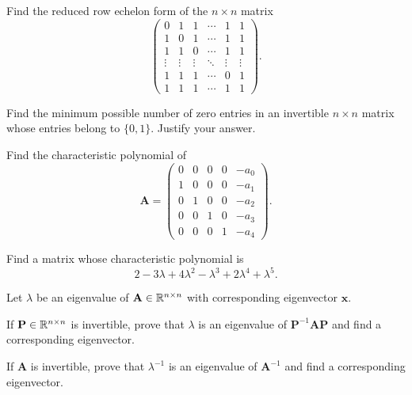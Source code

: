 \begin{problem}
\begin{problemsubparts}
\item Find the reduced row echelon form of the $n\times n$ matrix
\[
\begin{pmatrix}
0&1&1&\cdots&1&1\\
1&0&1&\cdots&1&1\\
1&1&0&\cdots&1&1\\
\vdots&\vdots&\vdots&\ddots&\vdots&\vdots\\
1&1&1&\cdots&0&1\\
1&1&1&\cdots&1&1
\end{pmatrix}.
\]
\item Find the minimum possible number of zero entries in an invertible $n\times n$ matrix whose entries belong to $\{0,1\}$. Justify your answer.
\end{problemsubparts}
\end{problem}

\begin{problem}
\begin{problemsubparts}
\item Find the characteristic polynomial of
\[
\mathbf A=
\begin{pmatrix}
0&0&0&0&-a_0\\
1&0&0&0&-a_1\\
0&1&0&0&-a_2\\
0&0&1&0&-a_3\\
0&0&0&1&-a_4
\end{pmatrix}.
\]
\item Find a matrix whose characteristic polynomial is
\[
2-3\lambda+4\lambda^2-\lambda^3+2\lambda^4+\lambda^5.
\]
\end{problemsubparts}
\end{problem}

\begin{problem}
Let $\lambda$ be an eigenvalue of $\mathbf A\in\mathbb{R}^{n\times n}$ with corresponding eigenvector $\mathbf x$.
\begin{problemsubparts}
\item If $\mathbf P\in\mathbb{R}^{n\times n}$ is invertible, prove that $\lambda$ is an eigenvalue of $\mathbf P^{-1}\mathbf A\mathbf P$ and find a corresponding eigenvector.
\item If $\mathbf A$ is invertible, prove that $\lambda^{-1}$ is an eigenvalue of $\mathbf A^{-1}$ and find a corresponding eigenvector.
\end{problemsubparts}
\end{problem}

